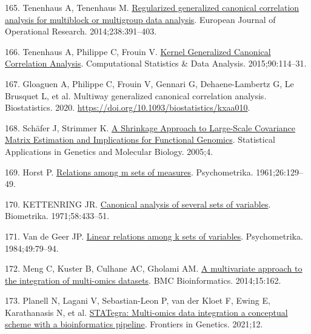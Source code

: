 \documentclass[
  12pt,
  a4paper,
  twoside,
  openright]{book}
\newlength{\cslhangindent}
\newlength{\cslentryspacingunit} %
\newenvironment{CSLReferences}[2] %
 {%
  \setlength{\parindent}{0pt}
  \ifodd #1
  \let\oldpar\par
  \def\par{\hangindent=\cslhangindent\oldpar}
  \fi
  \setlength{\parskip}{#2\cslentryspacingunit}
 }%
 {}
\begin{document}
\begin{CSLReferences}{0}{0}
\leavevmode{}%
165. Tenenhaus A, Tenenhaus M. \href{https://doi.org/10.1016/j.ejor.2014.01.008}{Regularized generalized canonical correlation analysis for multiblock or multigroup data analysis}. European Journal of Operational Research. 2014;238:391--403.

\leavevmode{}%
166. Tenenhaus A, Philippe C, Frouin V. \href{https://doi.org/10.1016/j.csda.2015.04.004}{Kernel {Generalized Canonical Correlation Analysis}}. Computational Statistics \& Data Analysis. 2015;90:114--31.

\leavevmode{}%
167. Gloaguen A, Philippe C, Frouin V, Gennari G, Dehaene-Lambertz G, Le Brusquet L, et al. Multiway generalized canonical correlation analysis. Biostatistics. 2020. \url{https://doi.org/10.1093/biostatistics/kxaa010}.

\leavevmode{}%
168. Schäfer J, Strimmer K. \href{https://doi.org/10.2202/1544-6115.1175}{A Shrinkage Approach to Large-Scale Covariance Matrix Estimation and Implications for Functional Genomics}. Statistical Applications in Genetics and Molecular Biology. 2005;4.

\leavevmode{}%
169. Horst P. \href{https://doi.org/10.1007/BF02289710}{Relations among m sets of measures}. Psychometrika. 1961;26:129--49.

\leavevmode{}%
170. KETTENRING JR. \href{https://doi.org/10.1093/biomet/58.3.433}{Canonical analysis of several sets of variables}. Biometrika. 1971;58:433--51.

\leavevmode{}%
171. Van de Geer JP. \href{https://doi.org/10.1007/BF02294207}{Linear relations among k sets of variables}. Psychometrika. 1984;49:79--94.

\leavevmode{}%
172. Meng C, Kuster B, Culhane AC, Gholami AM. \href{https://doi.org/10.1186/1471-2105-15-162}{A multivariate approach to the integration of multi-omics datasets}. BMC Bioinformatics. 2014;15:162.

\leavevmode{}%
173. Planell N, Lagani V, Sebastian-Leon P, van der Kloet F, Ewing E, Karathanasis N, et al. \href{https://doi.org/10.3389/fgene.2021.620453}{STATegra: Multi-omics data integration {\textendash} a conceptual scheme with a bioinformatics pipeline}. Frontiers in Genetics. 2021;12.


\end{CSLReferences}
\end{document}
